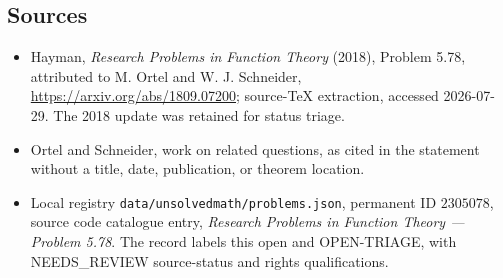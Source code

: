 \documentclass[11pt]{article}
\begin{document}
\subsection{Sources}
\begin{itemize}
\item Hayman, \emph{Research Problems in Function Theory} (2018), Problem 5.78, attributed to M. Ortel and W. J. Schneider, \url{https://arxiv.org/abs/1809.07200}; source-TeX extraction, accessed 2026-07-29. The 2018 update was retained for status triage.
\item Ortel and Schneider, work on related questions, as cited in the statement without a title, date, publication, or theorem location.
\item Local registry \texttt{data/unsolvedmath/problems.json}, permanent ID $2305078$, source code catalogue entry, \emph{Research Problems in Function Theory --- Problem 5.78}. The record labels this open and OPEN-TRIAGE, with NEEDS\_REVIEW source-status and rights qualifications.
\end{itemize}
\end{document}
